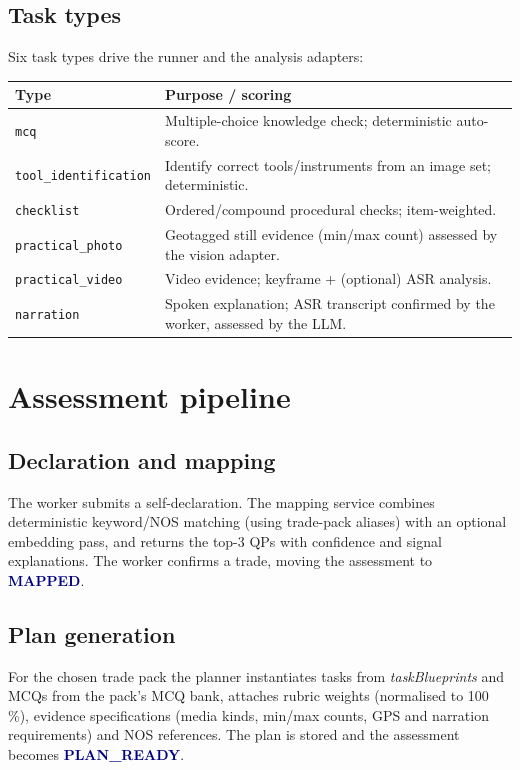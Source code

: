 \documentclass[11pt,a4paper]{article}
\newcommand{\code}[1]{\texttt{\small #1}}
\newcommand{\status}[1]{\textcolor{navy}{\textbf{#1}}}
\begin{document}
\subsection{Task types}
Six task types drive the runner and the analysis adapters:
\begin{center}
\begin{tabular}{L{4.1cm}L{11.5cm}}
\toprule
\textbf{Type} & \textbf{Purpose / scoring} \\
\midrule
\code{mcq} & Multiple-choice knowledge check; deterministic auto-score. \\
\code{tool_identification} & Identify correct tools/instruments from an
  image set; deterministic. \\
\code{checklist} & Ordered/compound procedural checks; item-weighted. \\
\code{practical_photo} & Geotagged still evidence (min/max count) assessed
  by the vision adapter. \\
\code{practical_video} & Video evidence; keyframe + (optional) ASR analysis. \\
\code{narration} & Spoken explanation; ASR transcript confirmed by the
  worker, assessed by the LLM. \\
\bottomrule
\end{tabular}
\end{center}

\section{Assessment pipeline}
\subsection{Declaration and mapping}
The worker submits a self-declaration. The mapping service combines
deterministic keyword/NOS matching (using trade-pack aliases) with an optional
embedding pass, and returns the top-3 QPs with confidence and signal
explanations. The worker confirms a trade, moving the assessment to
\status{MAPPED}.

\subsection{Plan generation}
For the chosen trade pack the planner instantiates tasks from
\emph{taskBlueprints} and MCQs from the pack's MCQ bank, attaches rubric
weights (normalised to 100\,\%), evidence specifications (media kinds,
min/max counts, GPS and narration requirements) and NOS references. The plan
is stored and the assessment becomes \status{PLAN\_READY}.
\end{document}
